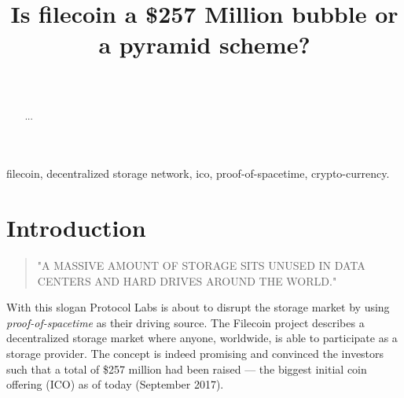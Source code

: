 \documentclass[journal]{IEEEtran}
\begin{document}
%
\title{Is filecoin a \$257 Million bubble or a pyramid scheme?}
%
%
%

\author{
 \\
}


\maketitle

\begin{abstract}

...

\end{abstract}

\begin{IEEEkeywords}
filecoin, decentralized storage network, ico, proof-of-spacetime, crypto-currency.
\end{IEEEkeywords}

\IEEEpeerreviewmaketitle

\section{Introduction}

\begin{quote}"A MASSIVE AMOUNT OF STORAGE SITS UNUSED IN DATA CENTERS AND HARD DRIVES AROUND THE WORLD." \cite{filecoin-io}\end{quote}
With this slogan Protocol Labs is about to disrupt the storage market by using \textit{proof-of-spacetime} as their driving source.
The Filecoin project describes a decentralized storage market where anyone, worldwide, is able to participate as a storage provider.
The concept is indeed promising and convinced the investors such that a total of \$257 million had been raised –-- the biggest initial coin offering (ICO) as of today (September 2017).
\end{document}
